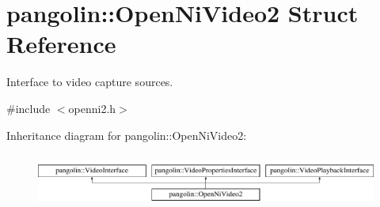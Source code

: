 \hypertarget{structpangolin_1_1_open_ni_video2}{}\section{pangolin\+:\+:Open\+Ni\+Video2 Struct Reference}
\label{structpangolin_1_1_open_ni_video2}


Interface to video capture sources.  




{\ttfamily \#include $<$openni2.\+h$>$}

Inheritance diagram for pangolin\+:\+:Open\+Ni\+Video2\+:\begin{figure}[H]
\begin{center}
\leavevmode
\includegraphics[height=1.736434cm]{structpangolin_1_1_open_ni_video2}
\end{center}
\end{figure}
